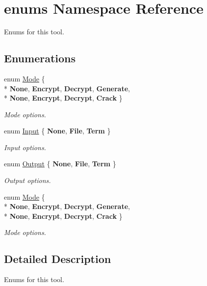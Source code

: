 \hypertarget{namespaceenums}{}\section{enums Namespace Reference}
\label{namespaceenums}


Enums for this tool.  


\subsection*{Enumerations}
\begin{DoxyCompactItemize}
\item 
enum \hyperlink{namespaceenums_aed42844026607625098e717501196684}{Mode} \{ \\*
{\bfseries None}, 
{\bfseries Encrypt}, 
{\bfseries Decrypt}, 
{\bfseries Generate}, 
\\*
{\bfseries None}, 
{\bfseries Encrypt}, 
{\bfseries Decrypt}, 
{\bfseries Crack}
 \}\hypertarget{namespaceenums_aed42844026607625098e717501196684}{}\label{namespaceenums_aed42844026607625098e717501196684}
\begin{DoxyCompactList}\small\item\em Mode options. \end{DoxyCompactList}
\item 
enum \hyperlink{namespaceenums_ab5db094e889e32d585938ca2c0ecaeac}{Input} \{ {\bfseries None}, 
{\bfseries File}, 
{\bfseries Term}
 \}\hypertarget{namespaceenums_ab5db094e889e32d585938ca2c0ecaeac}{}\label{namespaceenums_ab5db094e889e32d585938ca2c0ecaeac}
\begin{DoxyCompactList}\small\item\em Input options. \end{DoxyCompactList}
\item 
enum \hyperlink{namespaceenums_aa6bed9061e05642c3bc9e93da4658512}{Output} \{ {\bfseries None}, 
{\bfseries File}, 
{\bfseries Term}
 \}\hypertarget{namespaceenums_aa6bed9061e05642c3bc9e93da4658512}{}\label{namespaceenums_aa6bed9061e05642c3bc9e93da4658512}
\begin{DoxyCompactList}\small\item\em Output options. \end{DoxyCompactList}
\item 
enum \hyperlink{namespaceenums_aed42844026607625098e717501196684}{Mode} \{ \\*
{\bfseries None}, 
{\bfseries Encrypt}, 
{\bfseries Decrypt}, 
{\bfseries Generate}, 
\\*
{\bfseries None}, 
{\bfseries Encrypt}, 
{\bfseries Decrypt}, 
{\bfseries Crack}
 \}\hypertarget{namespaceenums_aed42844026607625098e717501196684}{}\label{namespaceenums_aed42844026607625098e717501196684}
\begin{DoxyCompactList}\small\item\em Mode options. \end{DoxyCompactList}
\end{DoxyCompactItemize}


\subsection{Detailed Description}
Enums for this tool. 